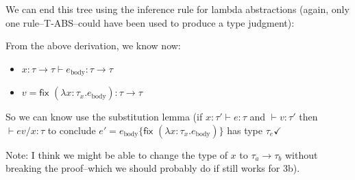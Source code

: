 \documentclass[10pt, oneside]{article}
\begin{document}
\begin{enumerate}
\begin{enumerate}
		We can end this tree using the inference rule for lambda abstractions (again, 
		only one rule--T-ABS--could have been used to produce a type judgment):
		
		\begin{prooftree}
		\end{prooftree}
		
		From the above derivation, we know now:
		\begin{itemize}
			\item $x: \tau \rightarrow \tau \vdash e_\text{body} : \tau \rightarrow \tau$
			\item $v = \textsf{fix } (\lambda x: \tau_x.e_\text{body}): \tau \rightarrow \tau$
		\end{itemize}
		
		So we can know use the substitution lemma (if $x:\tau' \vdash e:\tau$ and 
		$\vdash v:\tau'$ then $\vdash e{v/x}: \tau$ to conclude $e' = e_\text{body} 
		\{\textsf{fix } (\lambda x: \tau_x.e_\text{body}) \}$ has type $\tau_e 
		\checkmark$
		
		Note: I think we might be able to change the type of $x$ to $\tau_a \rightarrow 
		\tau_b$ without breaking the proof--which we should probably do if still works 
		for 3b).
	\end{enumerate}
\end{enumerate}
\end{document}
